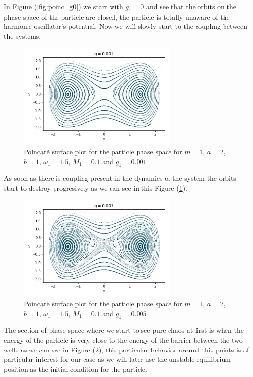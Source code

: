 In Figure (\ref{fig:poinc_g0}) we start with $g_1=0$ and see that the orbits on the phase space of the particle are closed, the particle is totally unaware of the harmonic oscillator's potential. Now we will slowly start to  the coupling between the systems.\par 


\begin{figure}[H]
\centering
\includegraphics[width=0.7\textwidth]{Figures/poincare_g0001.png}
\caption{Poincaré surface plot for the particle phase space for $m=1$, $a=2$, $b=1$, $\omega_1=1.5$, $M_1=0.1$ and $g_1=0.001$\label{fig:poinc_g0001}
}
\end{figure}

As soon as there is coupling present in the dynamics of the system the orbits start to destroy progresively as we can see in this Figure (\ref{fig:poinc_g0001}). 

\begin{figure}[H]
\centering
\includegraphics[width=0.7\textwidth]{Figures/poincare_g0005.png}
\caption{Poincaré surface plot for the particle phase space for $m=1$, $a=2$, $b=1$, $\omega_1=1.5$, $M_1=0.1$ and $g_1=0.005$\label{fig:poinc_g0005}
}
\end{figure}

The section of phase space where we start to see pure chaos at first is when the energy of the particle is very close to the energy of the barrier between the two wells as we can see in Figure (\ref{fig:poinc_g0005}), this particular behavior around this points is of particular interest for our case as we will later use the unstable equilibrium position as the initial condition for the particle.

